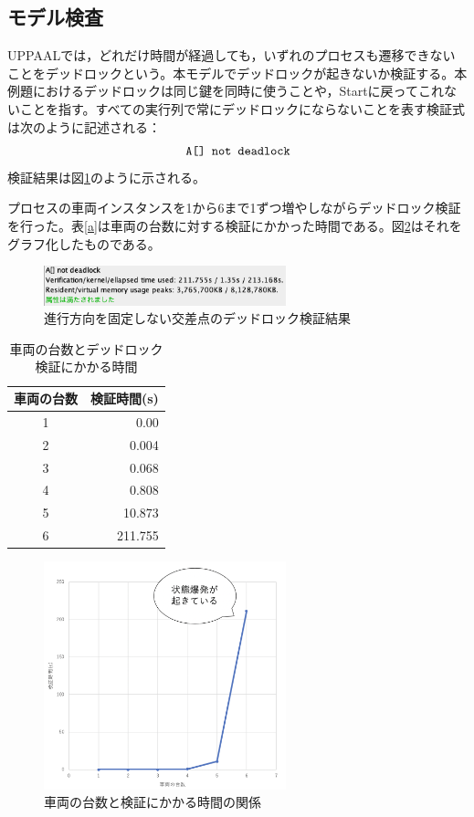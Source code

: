\documentclass[twocolumn,10pt]{jsarticle}
\begin{document}
	\subsection{モデル検査}
	UPPAALでは，どれだけ時間が経過しても，いずれのプロセスも遷移できないことをデッドロックという。本モデルでデッドロックが起きないか検証する。本例題におけるデッドロックは同じ鍵を同時に使うことや，Startに戻ってこれないことを指す。すべての実行列で常にデッドロックにならないことを表す検証式は次のように記述される：
	\[
	\mbox{\tt{A[] not deadlock}}
	\]
	検証結果は図\ref{IBC6}のように示される。
	
	プロセスの車両インスタンスを1から6まで1ずつ増やしながらデッドロック検証を行った。表\ref{a}は車両の台数に対する検証にかかった時間である。図\ref{IVT}はそれをグラフ化したものである。
	\begin{figure}[htbp]
	\centering
	\includegraphics[width=70mm]{InterBigCar6.png}
	\caption{進行方向を固定しない交差点のデッドロック検証結果}
	\label{IBC6}
	\end{figure}
	
	\begin{table}[htb]
	\centering
	\caption{車両の台数とデッドロック検証にかかる時間}
	\label{a}
	 \begin{tabular}{|c|r|} \hline
	    車両の台数 & 検証時間(s)  \\ \hline
	   1& 0.00  \\ \hline
	   2 & 0.004 \\ \hline
	   3 & 0.068 \\ \hline
	   4 & 0.808 \\ \hline
	   5 & 10.873 \\ \hline
	   6 & 211.755\\ \hline
	 \end{tabular}
	 \label{testcase}
	\end{table}
	
	\begin{figure}[htbp]
	\centering
	\includegraphics[width=70mm]{IntersectionVerificationTime.png}
	\caption{車両の台数と検証にかかる時間の関係}
	\label{IVT}
	\end{figure}
\end{document}

